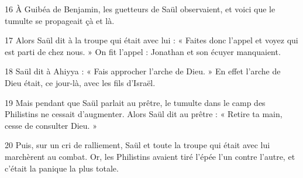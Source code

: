 
16 À Guibéa de Benjamin, les guetteurs de Saül observaient, et voici que le tumulte se propageait çà et là.

17 Alors Saül dit à la troupe qui était avec lui : « Faites donc l’appel et voyez qui est parti de chez nous. » On fit l’appel : Jonathan et son écuyer manquaient.

18 Saül dit à Ahiyya : « Fais approcher l’arche de Dieu. » En effet l’arche de Dieu était, ce jour-là, avec les fils d’Israël.

19 Mais pendant que Saül parlait au prêtre, le tumulte dans le camp des Philistins ne cessait d’augmenter. Alors Saül dit au prêtre : « Retire ta main, cesse de consulter Dieu. »

20 Puis, sur un cri de ralliement, Saül et toute la troupe qui était avec lui marchèrent au combat. Or, les Philistins avaient tiré l’épée l’un contre l’autre, et c’était la panique la plus totale.